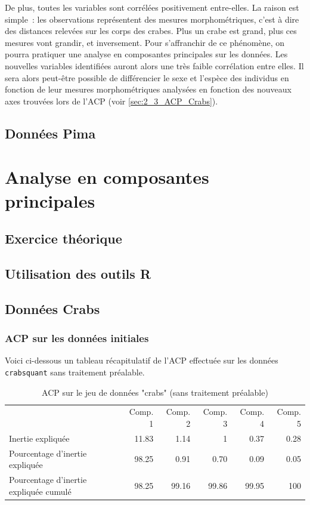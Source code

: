 \documentclass[a4paper,11pt]{report}
\begin{document}
De plus, toutes les variables sont corrélées positivement entre-elles. La raison est simple~: les observations représentent des mesures morphométriques, c'est à dire des distances relevées sur les corps des crabes. Plus un crabe est grand, plus ces mesures vont grandir, et inversement.
Pour s'affranchir de ce phénomène, on pourra pratiquer une analyse en composantes principales sur les données. Les nouvelles variables identifiées auront alors une très faible corrélation entre elles. Il sera alors peut-être possible de différencier le sexe et l'espèce des individus en fonction de leur mesures morphométriques analysées en fonction des nouveaux axes trouvées lors de l'ACP (voir \autoref{sec:2_3_ACP_Crabs}).


\section{Données Pima}




\chapter{Analyse en composantes principales}


\section{Exercice théorique}


\section{Utilisation des outils R}


\section{Données Crabs}
\label{sec:2_3_ACP_Crabs}

\subsection{ACP sur les données initiales}

Voici ci-dessous un tableau récapitulatif de l'ACP effectuée sur les données \texttt{crabsquant} sans traitement préalable.

\begin{table}[H]
	\centering
	\captionsetup{justification=centering, margin=2cm}
	\caption{ACP sur le jeu de données "crabs" (sans traitement préalable)}
	\label{table:acp_crabs_initial_data}
	\begin{tabular}{lrrrrr}
		& Comp. 1 & Comp. 2 & Comp. 3 & Comp. 4 & Comp. 5 \\
		Inertie expliquée & 11.83 & 1.14 & 1 & 0.37 & 0.28 \\
		Pourcentage d'inertie expliquée & 98.25 & 0.91 & 0.70 & 0.09 & 0.05 \\
		Pourcentage d'inertie expliquée cumulé & 98.25 & 99.16 & 99.86 & 99.95 & 100
	\end{tabular}
\end{table}
\end{document}
